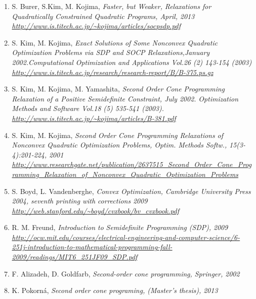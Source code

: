 \documentclass[12pt]{book}
\theoremstyle{definition}
\begin{document}
\begin{enumerate}
\renewcommand*\labelenumi{[\theenumi]}

%
\item S. Burer, S.Kim, M. Kojima, \it Faster, but Weaker, Relaxations for Quadratically Constrained Quadratic Programs, \rm April, 2013 \\
\url{http://www.is.titech.ac.jp/~kojima/articles/socpsdp.pdf}
\label{BurerKimKojimaFasterWeakerRelax}
%
\item S. Kim, M. Kojima, \it Exact Solutions of Some Nonconvex Quadratic Optimization Problems via SDP and SOCP Relaxations,\rm January 2002.Computational Optimization and Applications Vol.26 (2) 143-154 (2003)\\
\url{http://www.is.titech.ac.jp/research/research-report/B/B-375.ps.gz}
\label{KimKojimaExactSolViaSDPandSOCP}
%
\item S. Kim, M. Kojima, M. Yamashita, \it Second Order Cone Programming Relaxation of a Positive Semidefinite Constraint, \rm July 2002. Optimization Methods and Software Vol.18 (5) 535-541 (2003).\\
\url{http://www.is.titech.ac.jp/~kojima/articles/B-381.pdf}
\label{KimKojimaSOCPRelaxOfPSDconstr}
%
\item S. Kim, M. Kojima, \it Second Order Cone Programming Relaxations of Nonconvex Quadratic Optimization Problems, \rm Optim. Methods Softw., 15(3-4):201-224, 2001 \\
\url{http://www.researchgate.net/publication/2637515_Second_Order_Cone_Programming_Relaxation_of_Nonconvex_Quadratic_Optimization_Problems}
\label{KimKojimaSOCPofNoncvxQOP}
%
\item S. Boyd, L. Vandenberghe, \it Convex Optimization, \rm Cambridge University Press 2004, seventh printing with corrections 2009 \\
\url{http://web.stanford.edu/~boyd/cvxbook/bv_cvxbook.pdf}
\label{BoydCvxOpt}
%
\item R. M. Freund, \it Introduction to Semidefinite Programming (SDP), \rm 2009 \\ \url{http://ocw.mit.edu/courses/electrical-engineering-and-computer-science/6-251j-introduction-to-mathematical-programming-fall-2009/readings/MIT6_251JF09_SDP.pdf}
\label{FreundIntroSDP}
%
\item F. Alizadeh, D. Goldfarb,  \it Second-order cone programming, \rm Springer, 2002 \\
\label{GoldfarbSOCP}
%
\item K. Pokorná, \it Second order cone programing, (Master's thesis), \rm 2013 \\

\end{enumerate}
\end{document}
